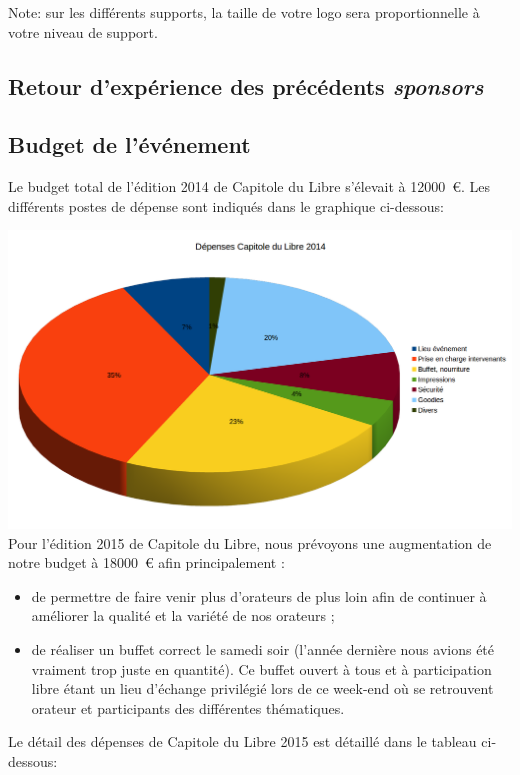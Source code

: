 Note: sur les différents supports, la taille de votre logo sera proportionnelle à votre niveau de support.

	\subsection{Retour d’expérience des précédents \textit{sponsors}}
	\subsection{Budget de l’événement}

Le budget total de l'édition 2014 de Capitole du Libre s'élevait à \SI{12000}{\euro}. Les différents postes de dépense sont indiqués dans le graphique ci-dessous:

\includegraphics[scale=0.6]{Images/budget_2014.png}\\

Pour l'édition 2015 de Capitole du Libre, nous prévoyons une augmentation de notre budget à \SI{18000}{\euro} afin principalement :
\begin{itemize}[label=$\bullet$]
\item de permettre de faire venir plus d'orateurs de plus loin afin de continuer à améliorer la qualité et la variété de nos orateurs ;
\item de réaliser un buffet correct le samedi soir (l'année dernière nous avions été vraiment trop juste en quantité). Ce buffet ouvert à tous et à participation libre étant un lieu d'échange privilégié lors de ce week-end où se retrouvent orateur et participants des différentes thématiques.
\end{itemize}

\Separateur

Le détail des dépenses de Capitole du Libre 2015 est détaillé dans le tableau ci-dessous:

